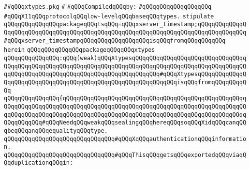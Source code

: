 \label{src/lib/x-kit/xclient/src/wire/xtypes.pkg}
\verb|##qQQqxtypes.pkg|\newline
\verb|#|\newline
\newline
\verb|#qQQqCompiledqQQqby:|\newline
\verb|#qQQqqQQqqQQqqQQqqQQq|\newline
\newline
\newline
\newline
\verb|#qQQqX11qQQqprotocolqQQqlow-levelqQQqbaseqQQqtypes.|\newline
\newline
\newline
\verb|stipulate|\newline
\verb|qQQqqQQqqQQqqQQqpackageqQQqtsqQQq=qQQqxserver_timestamp;qQQqqQQqqQQqqQQqqQQqqQQqqQQqqQQqqQQqqQQqqQQqqQQqqQQqqQQqqQQqqQQqqQQqqQQqqQQqqQQqqQQq#qQQqxserver_timestampqQQqqQQqqQQqqQQqqQQqisqQQqfromqQQqqQQqqQQq|\newline
\verb|herein|\newline
\newline
\verb|qQQqqQQqqQQqqQQqpackageqQQqqQQqxtypes|\newline
\verb|qQQqqQQqqQQqqQQq:qQQq(weak)qQQqXtypesqQQqqQQqqQQqqQQqqQQqqQQqqQQqqQQqqQQqqQQqqQQqqQQqqQQqqQQqqQQqqQQqqQQqqQQqqQQqqQQqqQQqqQQqqQQqqQQqqQQqqQQqqQQqqQQqqQQqqQQqqQQqqQQqqQQqqQQqqQQqqQQqqQQq#qQQqXtypesqQQqqQQqqQQqqQQqqQQqqQQqqQQqqQQqqQQqqQQqqQQqqQQqqQQqqQQqqQQqqQQqisqQQqfromqQQqqQQqqQQq|\newline
\verb|qQQqqQQqqQQqqQQq{qQQqqQQqqQQqqQQqqQQqqQQqqQQqqQQqqQQqqQQqqQQqqQQqqQQqqQQqqQQqqQQqqQQqqQQqqQQqqQQqqQQqqQQqqQQqqQQqqQQqqQQqqQQqqQQqqQQqqQQqqQQqqQQqqQQqqQQqqQQqqQQqqQQqqQQqqQQqqQQqqQQqqQQqqQQqqQQqqQQqqQQqqQQqqQQqqQQqqQQqqQQq#qQQqNeedqQQqweakqQQqsealingqQQqhereqQQqsoqQQqXidqQQqcanqQQqbeqQQqanqQQqequalityqQQqtype.|\newline
\newline
\verb|qQQqqQQqqQQqqQQqqQQqqQQqqQQqqQQq#qQQqXqQQqauthenticationqQQqinformation.|\newline
\verb|qQQqqQQqqQQqqQQqqQQqqQQqqQQqqQQq#qQQqThisqQQqgetsqQQqexportedqQQqviaqQQqduplicationqQQqin:|\newline
